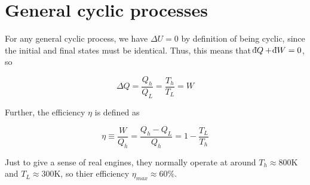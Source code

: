 \section{General cyclic processes}

For any general cyclic process, we have $\Delta U = 0$ by definition of being cyclic, since the initial and final states must be identical. Thus, this means that $\db Q + \db W = 0$, so 

\[ \Delta Q = \frac{Q_h}{Q_L} = \frac{T_h}{T_L} = W\]

Further, the efficiency $\eta$ is defined as 

\[ \eta \equiv \frac{W}{Q_h} = \frac{Q_h - Q_L}{Q_h} = 1 - \frac{T_L}{T_h}\]

Just to give a sense of real engines, they normally operate at around $T_h \approx 800$K and $T_L \approx 300$K, so thier efficiency $\eta_{max} \approx 60\%$.